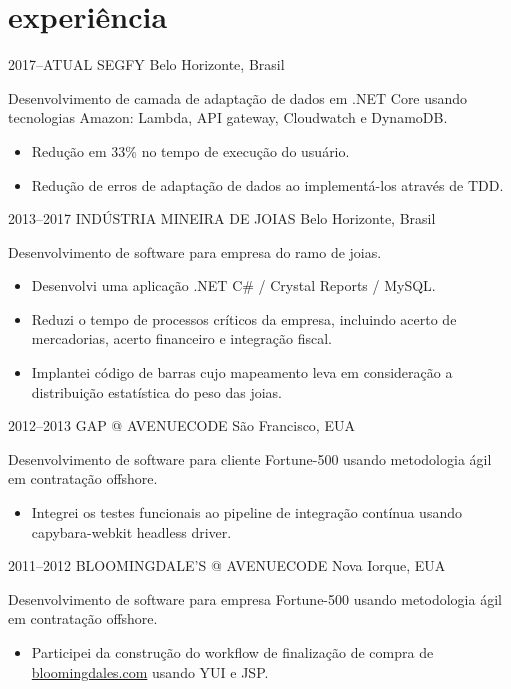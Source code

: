 \documentclass[]{friggeri-cv}
\begin{document}
\section{experiência}

\begin{entrylist}

\entry
{2017--ATUAL}
{SEGFY}
{Belo Horizonte, Brasil}
{ Desenvolvimento de camada de adaptação de dados em .NET Core usando tecnologias Amazon: Lambda, API gateway, Cloudwatch e DynamoDB.
    \begin{itemize}
        \item Redução em 33\% no tempo de execução do usuário.
        \item Redução de erros de adaptação de dados ao implementá-los através de TDD.
    \end{itemize}
}


\entry
{2013--2017}
{INDÚSTRIA MINEIRA DE JOIAS}
{Belo Horizonte, Brasil}
{ Desenvolvimento de software para empresa do ramo de joias.

  \begin{itemize}
    \item Desenvolvi uma aplicação .NET C\# / Crystal Reports / MySQL.
    \item Reduzi o tempo de processos críticos da empresa, incluindo acerto de mercadorias, acerto financeiro e integração fiscal.
    \item Implantei código de barras cujo mapeamento leva em consideração a distribuição estatística do peso das joias.
  \end{itemize}
  }

\entry
{2012--2013}
{GAP @ AVENUECODE}
{São Francisco, EUA}
{ Desenvolvimento de software para cliente Fortune-500 usando metodologia ágil em contratação offshore.
  \begin{itemize}
    \item Integrei os testes funcionais ao pipeline de integração contínua usando capybara-webkit headless driver.
  \end{itemize}
}


\entry
{2011--2012}
{BLOOMINGDALE'S @ AVENUECODE}
{Nova Iorque, EUA}
{ Desenvolvimento de software para empresa Fortune-500 usando metodologia ágil em contratação offshore.

  \begin{itemize}
    \item Participei da construção do workflow de finalização de compra de \href{http://www.bloomingdales.com}{bloomingdales.com} usando YUI e JSP.
  \end{itemize}
}


\end{entrylist}
\end{document}
